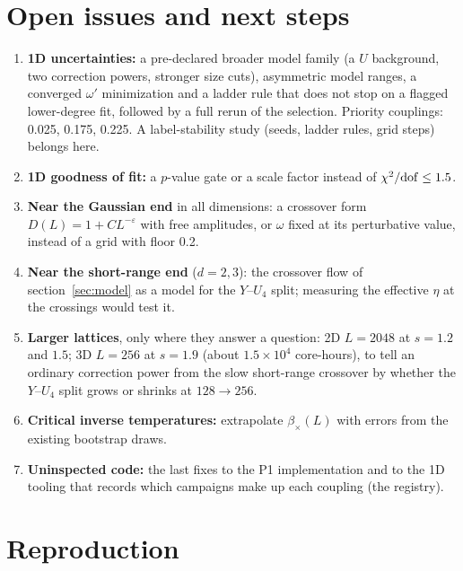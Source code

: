 \documentclass[10pt,a4paper]{article}
\begin{document}
\section{Open issues and next steps}\label{sec:open}
\begin{enumerate}[1.]
\item \textbf{1D uncertainties:} a pre-declared broader model family (a $U$ background, two correction powers, stronger size cuts), asymmetric
 model ranges, a converged $\omega'$ minimization and a ladder rule that does not stop on a flagged lower-degree fit, followed by a full rerun
 of the selection. Priority couplings: 0.025, 0.175, 0.225. A label-stability study (seeds, ladder rules, grid steps) belongs here.
\item \textbf{1D goodness of fit:} a $p$-value gate or a scale factor instead of $\chi^2/{\rm dof}\le1.5$.
\item \textbf{Near the Gaussian end} in all dimensions: a crossover form $D(L)=1+CL^{-\varepsilon}$ with free amplitudes, or $\omega$ fixed at its
 perturbative value, instead of a grid with floor 0.2.
\item \textbf{Near the short-range end} ($d=2,3$): the crossover flow of section~\ref{sec:model} as a model for the $Y$--$U_4$ split; measuring
 the effective $\eta$ at the crossings would test it.
\item \textbf{Larger lattices}, only where they answer a question: 2D $L=2048$ at $s=1.2$ and $1.5$; 3D $L=256$ at $s=1.9$ (about
 $1.5\times10^4$ core-hours), to tell an ordinary correction power from the slow short-range crossover by whether the $Y$--$U_4$ split grows or
 shrinks at $128\to256$.
\item \textbf{Critical inverse temperatures:} extrapolate $\beta_\times(L)$ with errors from the existing bootstrap draws.
\item \textbf{Uninspected code:} the last fixes to the P1 implementation and to the 1D tooling that records which campaigns make up each
 coupling (the registry).
\end{enumerate}

\section{Reproduction}\label{sec:repro}
\sloppy
\end{document}

